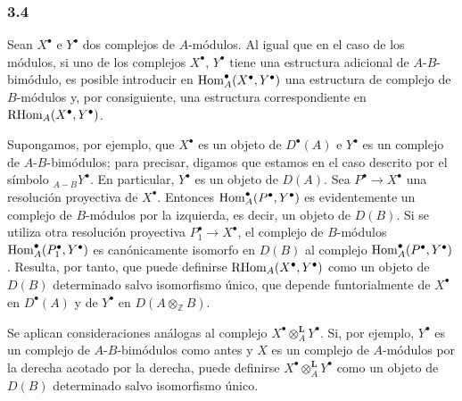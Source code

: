 \subsubsection*{3.4}

Sean $X^\bullet$ e $Y^\bullet$ dos complejos de $A$-módulos. Al igual que en el caso de los módulos, si uno de los complejos $X^\bullet$, $Y^\bullet$ tiene una estructura adicional de $A$-$B$-bimódulo, es posible introducir en $\operatorname{Hom}_A^\bullet(X^\bullet,Y^\bullet)$ una estructura de complejo de $B$-módulos y, por consiguiente, una estructura correspondiente en $\mathrm{RHom}_A(X^\bullet,Y^\bullet)$.

Supongamos, por ejemplo, que $X^\bullet$ es un objeto de $D^\bullet(A)$ e $Y^\bullet$ es un complejo de $A$-$B$-bimódulos; para precisar, digamos que estamos en el caso descrito por el símbolo ${}_{A-B}Y^\bullet$. En particular, $Y^\bullet$ es un objeto de $D(A)$. Sea $P^\bullet\to X^\bullet$ una resolución proyectiva de $X^\bullet$. Entonces $\operatorname{Hom}_A^\bullet(P^\bullet,Y^\bullet)$ es evidentemente un complejo de $B$-módulos por la izquierda, es decir, un objeto de $D(B)$. Si se utiliza otra resolución proyectiva $P_1^\bullet\to X^\bullet$, el complejo de $B$-módulos $\operatorname{Hom}_A^\bullet(P_1^\bullet,Y^\bullet)$ es canónicamente isomorfo en $D(B)$ al complejo $\operatorname{Hom}_A^\bullet(P^\bullet,Y^\bullet)$. Resulta, por tanto, que puede definirse $\mathrm{RHom}_A(X^\bullet,Y^\bullet)$ como un objeto de $D(B)$ determinado salvo isomorfismo único, que depende funtorialmente de $X^\bullet$ en $D^\bullet(A)$ y de $Y^\bullet$ en $D(A\otimes_{\mathbb Z}B)$.

Se aplican consideraciones análogas al complejo $X^\bullet\otimes_A^{\mathbf L}Y^\bullet$. Si, por ejemplo, $Y^\bullet$ es un complejo de $A$-$B$-bimódulos como antes y $X$ es un complejo de $A$-módulos por la derecha acotado por la derecha, puede definirse $X^\bullet\otimes_A^{\mathbf L}Y^\bullet$ como un objeto de $D(B)$ determinado salvo isomorfismo único.
